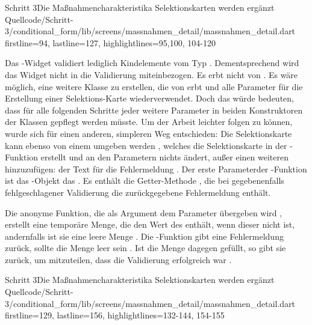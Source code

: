 \begin{alexlisting}{Schritt 3}{Die Maßnahmencharakteristika Selektionskarten werden ergänzt}
    {Quellcode/Schritt-3/conditional_form/lib/screens/massnahmen_detail/massnahmen_detail.dart}
    {firstline=94, lastline=127, highlightlines={95,100, 104-120}}
    \label{lst:Schritt3createMassnahmenTitelTextFormFieldValidator}
\end{alexlisting}
 
Das -Widget validiert lediglich Kindelemente vom Typ .
Dementsprechend wird das Widget  nicht in die Validierung miteinbezogen.
Es erbt nicht von .
Es wäre möglich, eine weitere Klasse zu erstellen, die von  erbt und alle Parameter für die Erstellung einer Selektions-Karte wiederverwendet.
Doch das würde bedeuten, dass für alle folgenden Schritte jeder weitere Parameter in beiden Konstruktoren der Klassen gepflegt werden müsste.
Um der Arbeit leichter folgen zu können, wurde sich für einen anderen, simpleren Weg entschieden: 
Die Selektionskarte kann ebenso von einem  umgeben werden , welches die Selektionskarte in der -Funktion erstellt und an den Parametern nichts ändert, außer einen weiteren hinzuzufügen: der Text für die Fehlermeldung . 
Der erste Parameterder -Funktion ist das -Objekt das .
Es enthält die Getter-Methode , die bei gegebenenfalls fehlgeschlagener Validierung die zurückgegebene Fehlermeldung enthält.

Die anonyme Funktion, die als Argument dem Parameter  übergeben wird , erstellt eine temporäre Menge, die den Wert des  enthält, wenn dieser nicht  ist, andernfalls ist sie eine leere Menge .
Die -Funktion gibt eine Fehlermeldung zurück, sollte die Menge leer sein . 
Ist die Menge dagegen gefüllt, so gibt sie  zurück, um mitzuteilen, dass die Validierung erfolgreich war .

\begin{alexlisting}{Schritt 3}{Die Maßnahmencharakteristika Selektionskarten werden ergänzt}
    {Quellcode/Schritt-3/conditional_form/lib/screens/massnahmen_detail/massnahmen_detail.dart}
    {firstline=129, lastline=156, highlightlines={132-144, 154-155}}
    \label{lst:Schritt3buildSelectionCardValidator}
\end{alexlisting}

